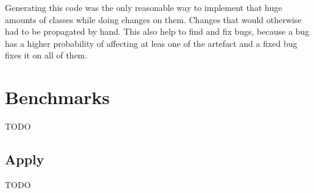 Generating this code was the only reasonable way to implement that huge amounts of classes while doing changes on them. Changes that would otherwise had to be propagated by hand. This also help to find and fix bugs, because a bug has a higher probability of affecting at leas one of the artefact and a fixed bug fixes it on all of them.

\section{Benchmarks}
\color{red} TODO \color{black}

\subsection{Apply}
\color{red} TODO \color{black}

